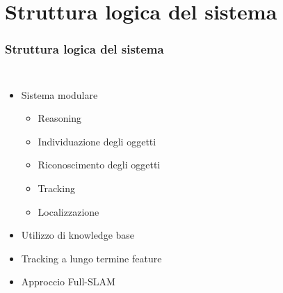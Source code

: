 \documentclass[c]{beamer}
\begin{document}
\begin{frame}
\begin{columns}[c, onlytextwidth]
\end{columns}

\end{frame}


\section{Struttura logica del sistema}

\begin{frame}

\frametitle{Struttura logica del sistema}

\begin{columns}[c, onlytextwidth]
 \begin{itemize}
  \item Sistema modulare
 \begin{itemize}
  \item Reasoning
  \item Individuazione degli oggetti
  \item Riconoscimento degli oggetti
  \item Tracking
  \item Localizzazione
 \end{itemize}
  \item Utilizzo di knowledge base
  \item Tracking a lungo termine feature
  \item Approccio Full-SLAM
 \end{itemize}
 
 
 
 \end{columns}

\end{frame}
\end{document}
